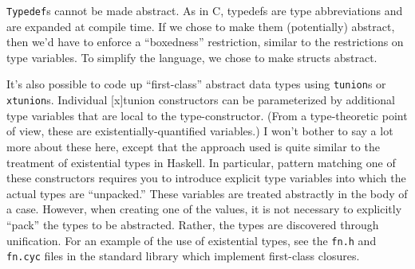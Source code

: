 \texttt{Typedef}s cannot be made abstract.  As in C, typedefs are type
abbreviations and are expanded at compile time.  If we chose to make
them (potentially) abstract, then we'd have to enforce a ``boxedness''
restriction, similar to the restrictions on type variables.  To
simplify the language, we chose to make structs abstract.

It's also possible to code up ``first-class'' abstract data types
using \texttt{tunion}s or \texttt{xtunion}s.  Individual [x]tunion
constructors can be parameterized by additional type variables that
are local to the type-constructor.  (From a type-theoretic point of
view, these are existentially-quantified variables.)  I won't bother
to say a lot more about these here, except that the approach used is
quite similar to the treatment of existential types in Haskell.  In
particular, pattern matching one of these constructors requires you to
introduce explicit type variables into which the actual types are
``unpacked.''  These variables are treated abstractly in the body of a
case.  However, when creating one of the values, it is not necessary
to explicitly ``pack'' the types to be abstracted.  Rather, the types
are discovered through unification.  For an example of the use of
existential types, see the \texttt{fn.h} and \texttt{fn.cyc} files in the
standard library which implement first-class closures.

